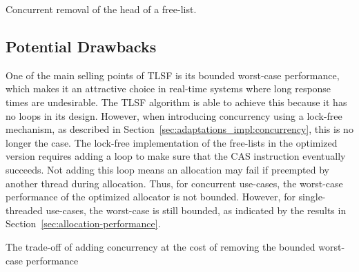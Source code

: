\begin{algorithm}[H]
    \SetAlgoLined


\label{algorithm:concurrent_remove_block}
\caption{Concurrent removal of the head of a free-list.}
\end{algorithm}

\subsection{Potential Drawbacks}

One of the main selling points of TLSF is its bounded worst-case performance, which makes it an attractive choice in real-time systems where long response times are undesirable. The TLSF algorithm is able to achieve this because it has no loops in its design. However, when introducing concurrency using a lock-free mechanism, as described in Section~\ref{sec:adaptations_impl:concurrency}, this is no longer the case. The lock-free implementation of the free-lists in the optimized version requires adding a loop to make sure that the CAS instruction eventually succeeds. Not adding this loop means an allocation may fail if preempted by another thread during allocation. Thus, for concurrent use-cases, the worst-case performance of the optimized allocator is not bounded. However, for single-threaded use-cases, the worst-case is still bounded, as indicated by the results in Section~\ref{sec:allocation-performance}.

The trade-off of adding concurrency at the cost of removing the bounded worst-case performance 

